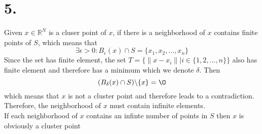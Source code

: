 \documentclass[11pt]{article}
\begin{document}
\section*{5.}
Given $x \in \mathbb{R}^N$ is a cluser point of $x$, if there is a neighborhood of $x$ contains finite points of $S$, which means that
\[
\exists \epsilon >0: B_\epsilon(x) \cap S = \{ x_1, x_2, \ldots, x_n\} 
\]
Since the set has finite element, the set $T = \{\| x-x_i\| | i\in \{1,2,\ldots, n\}\}$ also has finite element and therefore has a minimum which we denote $\delta$. Then 
\[(B_\delta(x) \cap S )\backslash \{x\}= \O\]
which means that $x$ is not a cluster point and therefore leads to a contradiction. Therefore, the neighborhood of $x$ must contain infinite elements. \\
If each neighborhood of $x$ contains an infinte number of points in $S$ then $x$ is obviously a cluster point
\pagebreak
\end{document}
